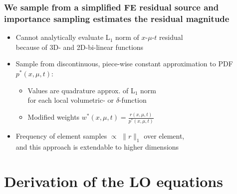 \documentclass[xcolor=dvipsnames,hyperref={pdfpagelabels=false},unknownkeysallowed]{beamer}
\newcommand{\ds}[0]{\displaystyle}
\newcommand{\colG}[1]{{\color{Gray!110} #1}}
\newlength{\wideitemsep}
\let\olditem\item
\renewcommand{\item}{\setlength{\itemsep}{\wideitemsep}\olditem}
\begin{document}
\begin{frame}
    \frametitle{We sample from a simplified FE residual source and\\ importance
    sampling estimates the residual magnitude}
    \addtolength{\wideitemsep}{0.05in}
    \begin{itemize}
        \item[] Cannot analytically evaluate L$_1$ norm of $x$-$\mu$-$t$ residual
            \\ \colG{because of 3D- and 2D-bi-linear functions }
        \item[] Sample from discontinuous, piece-wise constant approximation to PDF  $p^*(x,\mu,t)$:
           \begin{itemize}
            \item Values are quadrature approx. of L$_1$ norm \\ \colG{for each local volumetric- or $\delta$-function}
            \item Modified weights $w^*(x,\mu,t) = \frac{\ds r(x,\mu,t)}{\ds p^*(x,\mu,t)}$
            \end{itemize}
           \item[] Frequency of element samples $\propto$ $\|r\|_1$ over element,\\
               \colG{and this approach is extendable to higher dimensions}
    \end{itemize}
\end{frame}



\section{Derivation of the LO equations}
\subsection{}
\end{document}
